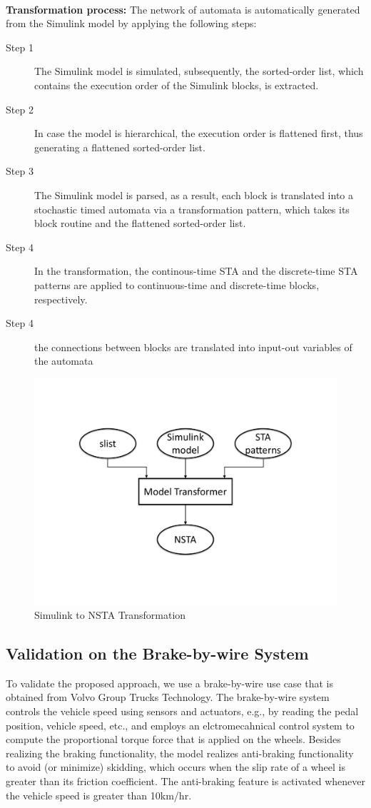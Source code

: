 \noindent\\ \textbf{Transformation process:} The network of automata is automatically generated from the Simulink model by applying the following steps:
\begin{description}
	\item[Step 1] The Simulink model is simulated, subsequently, the sorted-order list, which contains the execution order of the Simulink blocks, is extracted.
	\item[Step 2] In case the model is hierarchical, the execution order is flattened first, thus generating a flattened sorted-order list.
	\item[Step 3] The Simulink model is parsed, as a result, each block is translated into a stochastic timed automata via a transformation pattern, which takes its block routine and the flattened sorted-order list.
	\item[Step 4] In the transformation, the continous-time STA and the discrete-time STA patterns are applied to continuous-time and discrete-time blocks, respectively.
	\item[Step 4] the connections between blocks are translated into input-out variables of the automata 
\end{description}

\begin{figure}
	\centering
	\includegraphics[width=0.6\linewidth]{images/simulinkapproach}
	\caption{Simulink to NSTA Transformation}
	\label{fig:approachworkflow}
\end{figure}

\subsection{Validation on the Brake-by-wire System} 
To validate the proposed approach, we use a brake-by-wire use case that is obtained from Volvo Group Trucks Technology. The brake-by-wire system controls the vehicle speed using sensors and actuators, e.g., by reading the pedal position, vehicle speed, etc., and employs an elctromecahnical control system to compute the proportional torque force that is applied on the wheels. Besides realizing the braking functionality, the model realizes anti-braking functionality to avoid (or minimize) skidding, which occurs when the slip rate of a wheel is greater than its friction coefficient.  The anti-braking feature is activated whenever the vehicle speed is greater than 10km/hr.

